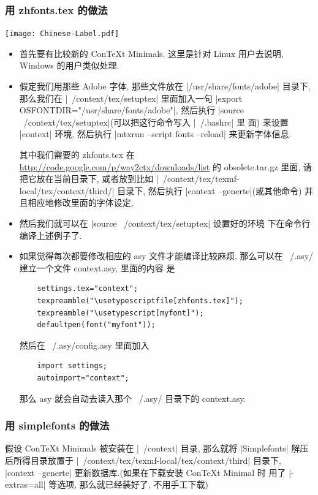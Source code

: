 \documentclass[nofonts,CJKnormalspaces]{ctexbook}[2009/05/20]
\begin{document}
\subsubsection{用 zhfonts.tex 的做法}
\begin{center}\texttt{[image: Chinese-Label.pdf]}\end{center}%

\begin{itemize}
\item 首先要有比较新的 ConTeXt  Minimals. 这里是针对 Linux 用户去说明,
  Windows 的用户类似处理.

\item 假定我们用那些 Adobe 字体, 那些文件放在 |/usr/share/fonts/adobe|
  目录下, 那么我们在   |~/context/tex/setuptex| 里面加入一句
  |export  OSFONTDIR="/usr/share/fonts/adobe"|, 然后执行
  |source  ~/context/tex/setuptex|(可以把这行命令写入 |~/.bashrc| 里
  面) 来设置 |context| 环境, 然后执行
  |mtxrun --script fonts --reload| 来更新字体信息.

  其中我们需要的 zhfonts.tex 在
  \url{http://code.google.com/p/way2ctx/downloads/list} 的
  obsolete.tar.gz 里面, 请把它放在当前目录下, 或者放到比如
  |~/context/tex/texmf-local/tex/context/third/| 目录下, 然后执行
  |context --generte|(或其他命令) 并且相应地修改里面的字体设定,

\item  然后我们就可以在 |source  ~/context/tex/setuptex| 设置好的环境
  下在命令行编译上述例子了.
\item 如果觉得每次都要修改相应的 asy 文件才能编译比较麻烦, 那么可以在
  ~/.asy/ 建立一个文件 context.asy, 里面的内容
  是  \label{ConTeXt:Settings}
  \begin{lstlisting}
    settings.tex="context";
    texpreamble("\usetypescriptfile[zhfonts.tex]");
    texpreamble("\usetypescript[myfont]");
    defaultpen(font("myfont"));
  \end{lstlisting}
  然后在 ~/.asy/config.asy 里面加入
  \begin{lstlisting}
    import settings;
    autoimport="context";
  \end{lstlisting}
  那么 asy 就会自动去读入那个 ~/.asy/ 目录下的 context.asy.
\end{itemize}
\subsubsection{用 simplefonts 的做法}
假设 ConTeXt Minimals 被安装在 |~/context| 目录, 那么就将
|Simplefonts| 解压后所得目录放置于
|~/context/tex/texmf-local/tex/context/third| 目录下,
|context --generte| 更新数据库.(如果在下载安装 ConTeXt Minimal 时
用了 |-extras=all| 等选项, 那么就已经装好了, 不用手工下载)
\end{document}
